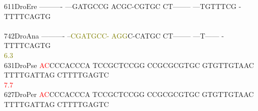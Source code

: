 \documentclass[11pt,twoside,reqno,a4paper]{article}
\begin{document}
{611\hspace*{2\charwidth}DroEre	----------	---GATGCCG	ACGC-CGTGC	CT--------	---TGTTTCG	-TTTTCAGTG	\\
\hspace*{5\charwidth}\hspace*{7\charwidth}\hspace*{1\charwidth}\hspace*{1\charwidth}\hspace*{1\charwidth}\hspace*{1\charwidth}\hspace*{1\charwidth}\hspace*{1\charwidth}\\
742\hspace*{2\charwidth}DroAna	----------	--\textcolor{olive}{C}\textcolor{olive}{G}\textcolor{olive}{A}\textcolor{olive}{T}\textcolor{olive}{G}\textcolor{olive}{C}\textcolor{olive}{C}\textcolor{olive}{-}	\textcolor{olive}{A}\textcolor{olive}{G}\textcolor{olive}{G}C-CATGC	CT--------	---T------	-TTTTCAGTG	\\
\hspace*{5\charwidth}\hspace*{7\charwidth}\hspace*{1\charwidth}\hspace*{12\charwidth}\textcolor{olive}{6.3}\hspace*{1\charwidth}\hspace*{1\charwidth}\hspace*{1\charwidth}\hspace*{1\charwidth}\hspace*{1\charwidth}\\
631\hspace*{2\charwidth}DroPse	\textcolor{red}{A}\textcolor{red}{C}CCCACCCA	TCCGCTCCGG	CCGCGCGTGC	GTGTTGTAAC	TTTTGATTAG	CTTTTGAGTC	\\
\hspace*{5\charwidth}\hspace*{7\charwidth}\hspace*{0\charwidth}\textcolor{red}{7.7}\hspace*{1\charwidth}\hspace*{1\charwidth}\hspace*{1\charwidth}\hspace*{1\charwidth}\hspace*{1\charwidth}\hspace*{1\charwidth}\\
627\hspace*{2\charwidth}DroPer	\textcolor{red}{A}\textcolor{red}{C}CCCACCCA	TCCGCTCCGG	CCGCGCGTGC	GTGTTGTAAC	TTTTGATTAG	CTTTTGAGTC	\\
}
\end{document}
